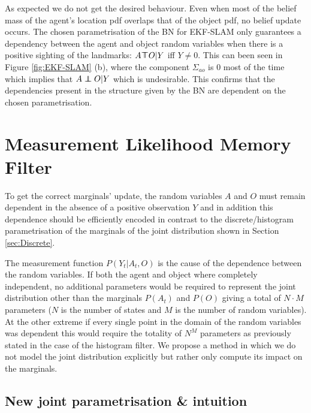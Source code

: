 As expected we do not get the desired behaviour. Even when most of the belief mass of the agent's 
location pdf overlaps that of the object pdf, no belief update occurs. The chosen parametrisation of the BN for EKF-SLAM only guarantees a 
dependency between the agent and object random variables when there is a positive sighting of the landmarks:
$A \dependent O | Y$ iff $Y \not= 0$.  This can been seen in Figure \ref{fig:EKF-SLAM} (b), where the component 
$\Sigma_{ao}$ is 0 most of the time which implies that $A \independent O | Y$ which is undesirable. 
This confirms that the dependencies present in the structure given by the BN are dependent on the chosen parametrisation.


\FloatBarrier
\section{Measurement Likelihood Memory Filter}\label{ch5:MLMF}

To get the correct marginals' update, the random variables $A$ and $O$ must remain 
dependent in the absence of a positive observation $Y$ and in addition this dependence should be efficiently encoded in contrast to the
discrete/histogram parametrisation of the marginals of the joint distribution shown in Section \ref{sec:Discrete}. 

The measurement function $P(Y_t|A_t,O)$ is the cause of the dependence between the random variables. If both the agent and object 
where completely independent, no additional parameters would be required to represent the joint distribution other than the marginals 
$P(A_t)$ and $P(O)$ giving a total of $N \cdot M$ parameters ($N$ is the number of states and $M$ is the number of random variables). 
At the other extreme if every single point in the domain of the random variables was dependent this would require the totality 
of $N^M$ parameters as previously stated in the case of the histogram filter. We propose a method in which we do not model the joint
distribution explicitly but rather only compute its impact on the marginals. 

\subsection{New joint parametrisation \& intuition}

